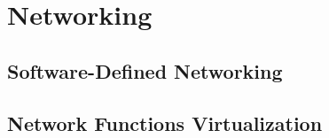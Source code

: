 \section{Networking} %
\label{sec:Networking}
\subsection{Software-Defined Networking} %
\label{sub:Software-Defined Networking}


\subsection{Network Functions Virtualization} %
\label{sub:Network Functions Virtualization}

